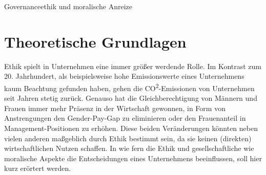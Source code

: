 \documentclass[12pt]{article}
\begin{document}
\renewcommand{\mytitle}{Governanceethik und\\moralische Anreize}%
\renewcommand{\myauthor}{Lennart Schulte-Kellinghaus,\\Timo Stovermann}%
\renewcommand{\headheight}{27pt}%

%
\begin{center}
\LARGE{Governanceethik und moralische Anreize}
\end{center}
\clearpage
\frontmatter%


\renewcommand{\plaintitle}{Tabellenverzeichnis}%
{\def\makebox[#1][#2]#3{#3}%
	\listoftables 
}

\clearpage

\renewcommand{\plaintitle}{Inhaltsverzeichnis}%
{\def\makebox[#1][#2]#3{#3}%
	\tableofcontents
}


\clearpage
\mainmatter%

\part{Theoretische Grundlagen}
Ethik spielt in Unternehmen eine immer größer werdende Rolle. Im Kontrast zum 20. Jahrhundert, als beispielsweise hohe Emissionswerte eines Unternehmens kaum Beachtung gefunden haben, gehen die CO\textsuperscript{2}-Emissionen von Unternehmen seit Jahren stetig zurück. Genauso hat die Gleichberechtigung von Männern und Frauen immer mehr Präsenz in der Wirtschaft gewonnen, in Form von Anstrengungen den Gender-Pay-Gap zu eliminieren oder den Frauenanteil in Management-Positionen zu erhöhen. Diese beiden Veränderungen könnten neben vielen anderen maßgeblich durch Ethik bestimmt sein, da sie keinen (direkten) wirtschaftlichen Nutzen schaffen. In wie fern die Ethik und gesellschaftliche wie moralische Aspekte die Entscheidungen eines Unternehmens beeinflussen, soll hier kurz erörtert werden.
\end{document}

